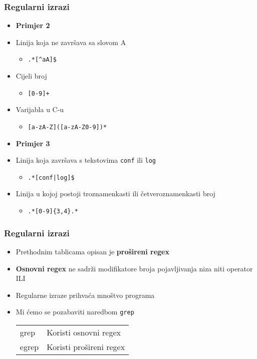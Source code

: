 \documentclass[table,usenames,dvipsnames]{beamer}
\newcommand{\shell}[1]{\texttt{#1}}
\begin{document}
\begin{frame}[t]
\frametitle{Regularni izrazi}
\begin{itemize}
  \item \textbf{Primjer 2}
  \item[] Linija koja ne završava sa slovom A 
  \begin{itemize}
    \item[] \shell{.*[\textasciicircum{}aA]\$}
  \end{itemize}
  \item[] Cijeli broj
  \begin{itemize}
    \item[] \shell{[0-9]+}
  \end{itemize}
  \item[] Varijabla u C-u
  \begin{itemize}
    \item[] \shell{[a-zA-Z]([a-zA-Z0-9])*}
  \end{itemize}
\end{itemize}
\vfill
\begin{itemize}
  \item \textbf{Primjer 3}
  \item[] Linija koja završava s tekstovima \shell{conf} ili \shell{log}
  \begin{itemize}
  	\item[] \shell{.*[conf|log]\$}
  \end{itemize}
  \item[] Linija u kojoj postoji troznamenkasti ili četveroznamenkasti broj
  \begin{itemize}
  	\item[] \shell{.*[0-9]\{3,4\}.*}
  \end{itemize}
\end{itemize}
\vfill
\end{frame}

\begin{frame}[t]
\frametitle{Regularni izrazi}
\begin{itemize}
	\item Prethodnim tablicama opisan je \textbf{prošireni regex}
	\item \textbf{Osnovni regex} ne sadrži modifikatore broja pojavljivanja niza niti operator ILI
\end{itemize}
\begin{itemize}
  \item Regularne izraze prihvaća mnoštvo programa
  \item Mi ćemo se pozabaviti naredbom \shell{grep}
  \begin{tabular}{l l}
    grep  &  Koristi osnovni regex\\
    egrep &  Koristi prošireni regex
  \end{tabular}
\end{itemize}
\end{frame}
  
\end{document}

